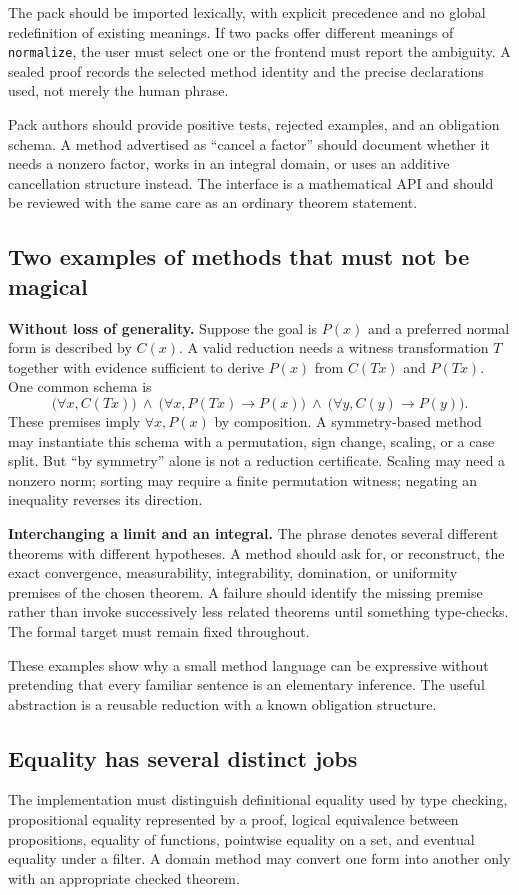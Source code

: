 \documentclass[11pt,a4paper]{article}
\theoremstyle{remark}
\newcommand{\ty}[1]{\texttt{#1}}
\begin{document}
The pack should be imported lexically, with explicit precedence and no global redefinition of existing meanings. If two packs offer different meanings of \ty{normalize}, the user must select one or the frontend must report the ambiguity. A sealed proof records the selected method identity and the precise declarations used, not merely the human phrase.

Pack authors should provide positive tests, rejected examples, and an obligation schema. A method advertised as ``cancel a factor'' should document whether it needs a nonzero factor, works in an integral domain, or uses an additive cancellation structure instead. The interface is a mathematical API and should be reviewed with the same care as an ordinary theorem statement.

\subsection{Two examples of methods that must not be magical}
\textbf{Without loss of generality.} Suppose the goal is $P(x)$ and a preferred normal form is described by $C(x)$. A valid reduction needs a witness transformation $T$ together with evidence sufficient to derive $P(x)$ from $C(Tx)$ and $P(Tx)$. One common schema is
\[
\bigl(\forall x, C(Tx)\bigr)\ \land\
\bigl(\forall x, P(Tx)\to P(x)\bigr)\ \land\
\bigl(\forall y, C(y)\to P(y)\bigr).
\]
These premises imply $\forall x,P(x)$ by composition. A symmetry-based method may instantiate this schema with a permutation, sign change, scaling, or a case split. But ``by symmetry'' alone is not a reduction certificate. Scaling may need a nonzero norm; sorting may require a finite permutation witness; negating an inequality reverses its direction.

\textbf{Interchanging a limit and an integral.} The phrase denotes several different theorems with different hypotheses. A method should ask for, or reconstruct, the exact convergence, measurability, integrability, domination, or uniformity premises of the chosen theorem. A failure should identify the missing premise rather than invoke successively less related theorems until something type-checks. The formal target must remain fixed throughout.

These examples show why a small method language can be expressive without pretending that every familiar sentence is an elementary inference. The useful abstraction is a reusable reduction with a known obligation structure.

\subsection{Equality has several distinct jobs}
The implementation must distinguish definitional equality used by type checking, propositional equality represented by a proof, logical equivalence between propositions, equality of functions, pointwise equality on a set, and eventual equality under a filter. A domain method may convert one form into another only with an appropriate checked theorem.
\end{document}
